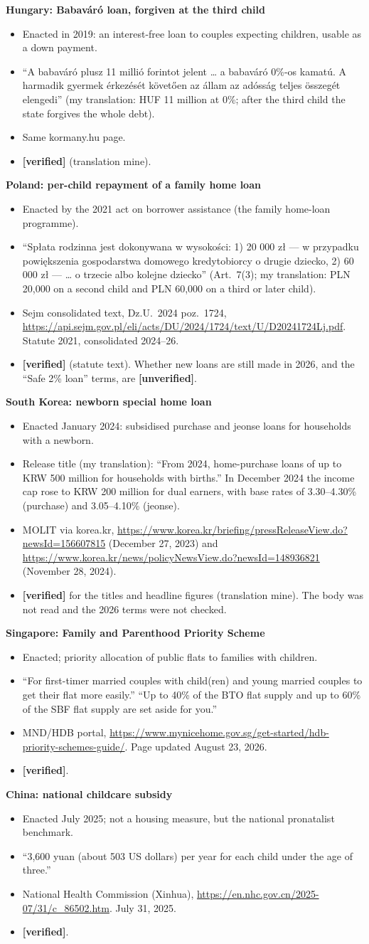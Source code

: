 \documentclass[10pt]{article}
\newcommand{\ok}{\textcolor{green!45!black}{\textbf{[verified]}}}
\newcommand{\unv}{\textcolor{red!70!black}{\textbf{[unverified]}}}
\newcommand{\entry}[5]{%
  \textbf{#1}\par
  \begin{itemize}
    \item #2
    \item #3
    \item #4
    \item #5
  \end{itemize}}
\begin{document}
\entry{Hungary: Babaváró loan, forgiven at the third child}
{Enacted in 2019: an interest-free loan to couples expecting children, usable as a down payment.}
{``A babaváró plusz 11 millió forintot jelent \ldots{} a babaváró 0\%-os kamatú. A harmadik gyermek érkezését követően az állam az adósság teljes összegét elengedi'' (my translation: HUF 11 million at 0\%; after the third child the state forgives the whole debt).}
{Same kormany.hu page.}
{\ok{} (translation mine).}

\entry{Poland: per-child repayment of a family home loan}
{Enacted by the 2021 act on borrower assistance (the family home-loan programme).}
{``Spłata rodzinna jest dokonywana w wysokości: 1) 20 000 zł --- w przypadku powiększenia gospodarstwa domowego kredytobiorcy o drugie dziecko, 2) 60 000 zł --- \ldots{} o trzecie albo kolejne dziecko'' (Art.~7(3); my translation: PLN 20,000 on a second child and PLN 60,000 on a third or later child).}
{Sejm consolidated text, Dz.U.\ 2024 poz.\ 1724, \url{https://api.sejm.gov.pl/eli/acts/DU/2024/1724/text/U/D20241724Lj.pdf}. Statute 2021, consolidated 2024--26.}
{\ok{} (statute text). Whether new loans are still made in 2026, and the ``Safe 2\% loan'' terms, are \unv.}

\entry{South Korea: newborn special home loan}
{Enacted January 2024: subsidised purchase and jeonse loans for households with a newborn.}
{Release title (my translation): ``From 2024, home-purchase loans of up to KRW 500 million for households with births.'' In December 2024 the income cap rose to KRW 200 million for dual earners, with base rates of 3.30--4.30\% (purchase) and 3.05--4.10\% (jeonse).}
{MOLIT via korea.kr, \url{https://www.korea.kr/briefing/pressReleaseView.do?newsId=156607815} (December 27, 2023) and \url{https://www.korea.kr/news/policyNewsView.do?newsId=148936821} (November 28, 2024).}
{\ok{} for the titles and headline figures (translation mine). The body was not read and the 2026 terms were not checked.}

\entry{Singapore: Family and Parenthood Priority Scheme}
{Enacted; priority allocation of public flats to families with children.}
{``For first-timer married couples with child(ren) and young married couples to get their flat more easily.'' ``Up to 40\% of the BTO flat supply and up to 60\% of the SBF flat supply are set aside for you.''}
{MND/HDB portal, \url{https://www.mynicehome.gov.sg/get-started/hdb-priority-schemes-guide/}. Page updated August 23, 2026.}
{\ok.}

\entry{China: national childcare subsidy}
{Enacted July 2025; not a housing measure, but the national pronatalist benchmark.}
{``3,600 yuan (about 503 US dollars) per year for each child under the age of three.''}
{National Health Commission (Xinhua), \url{https://en.nhc.gov.cn/2025-07/31/c_86502.htm}. July 31, 2025.}
{\ok.}
\end{document}
